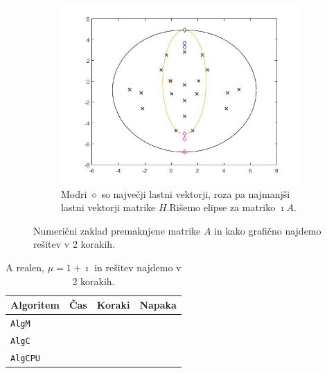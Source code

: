\documentclass[12pt,a4paper]{amsart}
\theoremstyle{definition}
\theoremstyle{plain}
\begin{document}
\begin{figure}[H]
\begin{subfigure}[t]{0.5\textwidth}
\includegraphics[width=0.9\linewidth]{RC2e2.jpg}
\caption{Modri $\diamond$ so največji lastni vektorji, roza pa najmanjši lastni vektorji matrike $H$.\footnotemark[\value{footnote}] Rišemo elipse za matriko $\imath A$.}
\label{fig:p43}
\end{subfigure}
\caption{Numerični zaklad premaknjene matrike $A$ in kako grafično najdemo rešitev v 2 korakih.}
\end{figure}

\begin{table}[H]
\begin{tabular}{|l|l|c|r|}
\hline
Algoritem & Čas & Koraki & Napaka\\
\hline
\hline
\verb+AlgM+ & & & \\
\hline
\verb+AlgC+ & & & \\
\hline
\verb+AlgCPU+ & & & \\
\hline
\end{tabular}
\caption{A realen, $\mu = 1 + \imath$ in rešitev najdemo v 2 korakih.}
\label{t4}
\end{table}
\end{document}

